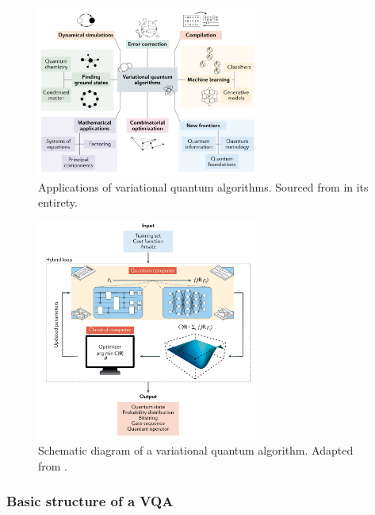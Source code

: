 \begin{figure}[H]
  \centering
  \includegraphics[width=0.65\textwidth]{Figures/Diagrams/VQAs_Applications.png}
  \caption{Applications of variational quantum algorithms. Sourced from \cite{Cerezo_2021} in its entirety.}
  \label{fig:VQAs_Applications}
\end{figure}

\begin{figure}[H]
  \centering
  \includegraphics[width=0.65\textwidth]{Figures/Diagrams/VQA_Schematic.png}
  \caption{Schematic diagram of a variational quantum algorithm. Adapted from \cite{Cerezo_2021}.}
  \label{fig:VQA_Schematic}
\end{figure}


\subsubsection{Basic structure of a VQA}

